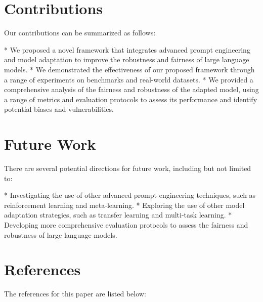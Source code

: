\documentclass{article}
\begin{document}
\section{Contributions}

Our contributions can be summarized as follows:

*   We proposed a novel framework that integrates advanced prompt engineering and model adaptation to improve the robustness and fairness of large language models.
*   We demonstrated the effectiveness of our proposed framework through a range of experiments on benchmarks and real-world datasets.
*   We provided a comprehensive analysis of the fairness and robustness of the adapted model, using a range of metrics and evaluation protocols to assess its performance and identify potential biases and vulnerabilities.

\section{Future Work}

There are several potential directions for future work, including but not limited to:

*   Investigating the use of other advanced prompt engineering techniques, such as reinforcement learning and meta-learning.
*   Exploring the use of other model adaptation strategies, such as transfer learning and multi-task learning.
*   Developing more comprehensive evaluation protocols to assess the fairness and robustness of large language models.

\section{References}

The references for this paper are listed below:
\end{document}

